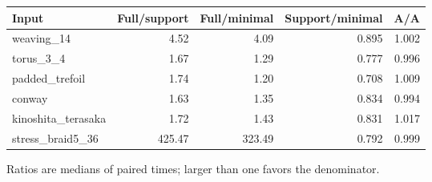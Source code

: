 \begin{center}
\begin{tabular}{@{}lrrrr@{}}
\toprule
Input & Full/support & Full/minimal & Support/minimal & A/A \\
\midrule
weaving\_14 & 4.52 & 4.09 & 0.895 & 1.002 \\
torus\_3\_4 & 1.67 & 1.29 & 0.777 & 0.996 \\
padded\_trefoil & 1.74 & 1.20 & 0.708 & 1.009 \\
conway & 1.63 & 1.35 & 0.834 & 0.994 \\
kinoshita\_terasaka & 1.72 & 1.43 & 0.831 & 1.017 \\
stress\_braid5\_36 & 425.47 & 323.49 & 0.792 & 0.999 \\
\bottomrule
\end{tabular}
\end{center}
Ratios are medians of paired times; larger than one favors the denominator.
